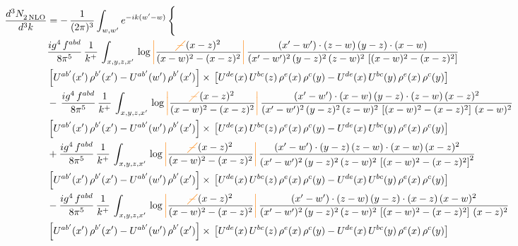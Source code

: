 \documentclass[9pt]{article}
\numberwithin{equation}{section}
\begin{document}
\begin{align}
   \frac{d^{3}N_{2\,\rm NLO}^{\rm}}{d^{3}k}  & =  -\,\frac{1}{(2\pi)^{3}}  \int_{w, w^\prime} e^{-ik(w^\prime-w)}\, \Bigg\{\notag \\ &  \frac{ig^{4}\, f^{abd}}{8\pi^{5}}\, \frac{1}{k^{+}}\, \int_{x,y,z,x'}\,\log{\textcolor{orange}{\left|\textcolor{black}{\frac{\textcolor{orange}{\cancel{-}}\,(x-z)^{2}}{(x-w)^{2}-(x-z)^{2}}}\right|}}\,\frac{(x'-w')\cdot (z-w)\, (y-z)\cdot (x-w)}{(x'-w')^{2}\, (y-z)^{2}\, (z-w)^{2}\,\left[(x-w)^{2}-(x-z)^{2}\right]}\, \notag \\ & \left[U^{ab'}(x')\,\rho^{b'}(x')-U^{ab'}(w')\, \rho^{b'}(x')\right]\times\,\left[U^{de}(x)\,U^{bc}(z)\, \rho^{e}(x)\,\rho^{c}(y)-U^{de}(x)\,U^{bc}(y)\,\rho^{e}(x)\,\rho^{c}(y)\right] \notag \\
& -\,\frac{ig^{4}\, f^{abd}}{8\pi^{5}}\, \frac{1}{k^{+}}\, \int_{x,y,z,x'}\,\log{\textcolor{orange}{\left|\textcolor{black}{\frac{\textcolor{orange}{\cancel{-}}\,(x-z)^{2}}{(x-w)^{2}-(x-z)^{2}}}\right|}}\,\frac{(x'-w')\cdot (x-w)\, (y-z)\cdot(z-w)\,(x-z)^{2}}{(x'-w')^{2}\, (y-z)^{2}\, (z-w)^{2}\,\left[(x-w)^{2}-(x-z)^{2}\right]\,(x-w)^{2}}\, \notag \\ & \left[U^{ab'}(x')\,\rho^{b'}(x')-U^{ab'}(w')\, \rho^{b'}(x')\right]\times\,\left[U^{de}(x)\,U^{bc}(z)\, \rho^{e}(x)\,\rho^{c}(y)-U^{de}(x)\,U^{bc}(y)\,\rho^{e}(x)\,\rho^{c}(y)\right] \notag \\
& +\frac{ig^{4}\, f^{abd}}{8\pi^{5}}\, \frac{1}{k^{+}}\, \int_{x,y,z,x'}\,\log{\textcolor{orange}{\left|\textcolor{black}{\frac{\textcolor{orange}{\cancel{-}}\,(x-z)^{2}}{(x-w)^{2}-(x-z)^{2}}}\right|}}\,\frac{(x'-w')\cdot  (y-z)\, (z-w)\cdot (x-w)\, (x-z)^{2}}{(x'-w')^{2}\, (y-z)^{2}\, (z-w)^{2}\,\left[(x-w)^{2}-(x-z)^{2}\right]^{2}}\, \notag \\ & \left[U^{ab'}(x')\,\rho^{b'}(x')-U^{ab'}(w')\, \rho^{b'}(x')\right]\times\,\left[U^{de}(x)\,U^{bc}(z)\, \rho^{e}(x)\,\rho^{c}(y)-U^{de}(x)\,U^{bc}(y)\,\rho^{e}(x)\,\rho^{c}(y)\right] \notag \\
& - \frac{ig^{4}\, f^{abd}}{8\pi^{5}}\, \frac{1}{k^{+}}\, \int_{x,y,z,x'}\,\log{\textcolor{orange}{\left|\textcolor{black}{\frac{\textcolor{orange}{\cancel{-}}\,(x-z)^{2}}{(x-w)^{2}-(x-z)^{2}}}\right|}}\,\frac{(x'-w')\cdot (z-w)\, (y-z)\cdot (x-z)\, (x-w)^{2}}{(x'-w')^{2}\, (y-z)^{2}\, (z-w)^{2}\,\left[(x-w)^{2} - (x-z)^{2}\right]\, (x-z)^{2}}\, \notag \\ & \left[U^{ab'}(x')\,\rho^{b'}(x')-U^{ab'}(w')\, \rho^{b'}(x')\right]\times\,\left[U^{de}(x)\,U^{bc}(z)\, \rho^{e}(x)\,\rho^{c}(y)-U^{de}(x)\,U^{bc}(y)\,\rho^{e}(x)\,\rho^{c}(y)\right] \notag \\

\end{align}
\end{document}
